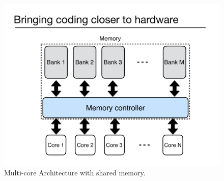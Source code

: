 \begin{figure}[t!] 
\centering
\includegraphics[width=0.85\linewidth]{figures/multicore-sys.pdf} 
\caption{Multi-core Architecture with shared memory.}
\label{fig:multicore}
\end{figure}

 